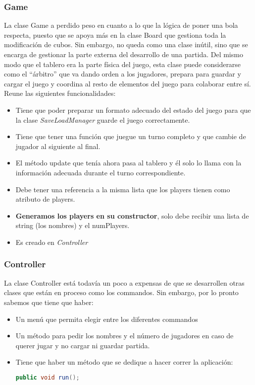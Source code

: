 \documentclass{article}
\begin{document}
\subsubsection*{Game}
La clase Game a perdido peso en cuanto a lo que la lógica de poner una bola respecta, puesto que se apoya más en la clase Board que gestiona toda la modificación de cubos. Sin embargo, no queda como una clase inútil, sino que se encarga de gestionar la parte externa del desarrollo de una partida. Del mismo modo que el tablero era la parte física del juego, esta clase puede considerarse como el ``árbitro'' que va dando orden a los jugadores, prepara para guardar y cargar el juego y coordina al resto de elementos del juego para colaborar entre sí. Reune las siguientes funcionalidades:
\begin{itemize}
\item Tiene que poder preparar un formato adecuado del estado del juego para que la clase \textit{SaveLoadManager} guarde el juego correctamente.
\item Tiene que tener una función que juegue un turno completo y que cambie de jugador al siguiente al final.
\item El método update que tenía ahora pasa al tablero y él solo lo llama con la información adecuada durante el turno correspondiente.
\item Debe tener una referencia a la misma lista que los players tienen como atributo de players.
\item \textbf{Generamos los players en su constructor}, solo debe recibir una lista de string (los nombres) y el numPlayers.
\item Es creado en \textit{Controller}
\end{itemize}

\subsubsection*{Controller}
La clase Controller está todavía un poco a expensas de que se desarrollen otras clases que están en proceso como los commandos. Sin embargo, por lo pronto sabemos que tiene que haber:
\begin{itemize}
\item Un menú que permita elegir entre los diferentes commandos
\item Un método para pedir los nombres y el número de jugadores en caso de querer jugar y no cargar ni guardar partida.
\item Tiene que haber un método que se dedique a hacer correr la aplicación:
\begin{lstlisting}[language=Java]
public void run();
\end{lstlisting}
\end{itemize}
\end{document}
